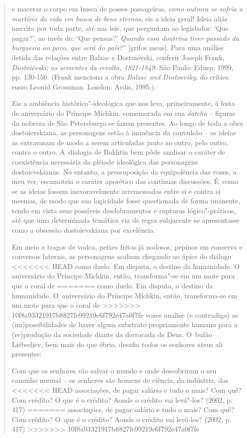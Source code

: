 {\begin{quote}
{  e macerar o corpo em busca de posses passageiras, \emph{como outrora
  se sofria o martírio da vida em busca de bens eternos}, eis a ideia
  geral! Ideia aliás inscrita por toda parte, até nas leis, que
  perguntam ao legislador: `Que pagar?', ao invés de: `Que pensas?'
  \emph{Quando essa doutrina tiver passado da burguesia ao povo, que
  será do país?}'' {[}grifos meus{]}. Para uma análise detida das
  relações entre Balzac e Dostoiévski, conferir Joseph Frank,
  \emph{Dostoiévski: as sementes da revolta, 1821-1849}. São Paulo:
  Edusp, 1999, pp. 130-156. (Frank menciona a obra \emph{Balzac and
  Dostoevsky}, do crítico russo Leonid Grossman. London: Ardis, 1995.)}.

Eis a ambiência histórico"-ideológica que nos leva, primeiramente, à
festa de aniversário do Príncipe Míchkin, comemorada em sua
\emph{datcha} -- figuras da nobreza de São Petersburgo se fazem
presentes. Ao longo de toda a obra dostoievskiana, as personagens estão
à iminência da convulsão -- as ideias as extravasam de modo a serem
articuladas junto ao outro, pelo outro, contra o outro. A~dialogia de
Bakhtin bem pôde analisar o caráter de coexistência necessária da
plêiade ideológica das personagens dostoievskianas. No entanto, a
pressuposição da equipolência das vozes, a meu ver, escamoteia o caráter
aporético das contínuas discussões. É~como se as ideias fossem
inexoravelmente arremessadas entre si e contra si mesmas, de modo que
sua logicidade fosse questionada de forma imanente, tendo em vista seus
possíveis desdobramentos e rupturas lógico"-práticos, até que uma
determinada temática via de regra subjacente se apresentasse como a
obsessão dostoievskiana por excelência.

Em meio a tragos de vodca, peixes fritos já nodosos, pepinos em conserva
e conversas laterais, as personagens acabam chegando ao ápice do diálogo
<<<<<<< HEAD
como duelo. Em disputa, o destino da humanidade. O aniversário do
Príncipe Míchkin, então, transforma"-se em um mote para que o coral de
=======
como duelo. Em disputa, o destino da humanidade. O~aniversário do
Príncipe Míchkin, então, transforma-se em um mote para que o coral de
>>>>>>> 10f8a93321917b8827fe99219c6f792e47a0f7fe
vozes analise (e contradiga) as (im)possibilidades de haver algum
substrato propriamente humano para a (re)produção da sociedade diante da
derrocada de Deus. O~bufão Liébediev, bem mais do que ébrio, desafia
todos os senhores ateus ali presentes:

Com que os senhores vão salvar o mundo e onde descobriram o seu caminho
normal -- os senhores são homens de ciência, da indústria, das
<<<<<<< HEAD
associações, de pagar salário e tudo o mais? Com quê? Com crédito? O que
é o crédito? Aonde o crédito vai levá"-los? (2002, p. 417)
=======
associações, de pagar salário e tudo o mais? Com quê? Com crédito? O~que
é o crédito? Aonde o crédito vai levá-los? (2002, p. 417)
>>>>>>> 10f8a93321917b8827fe99219c6f792e47a0f7fe


\end{quote}}
